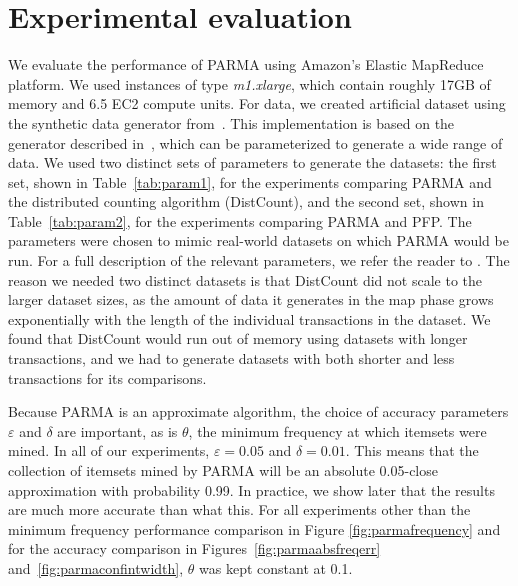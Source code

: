 \section{Experimental evaluation}
\label{sec:parmaeval}

We evaluate the performance of PARMA using Amazon's Elastic
MapReduce platform. We used instances of type \emph{m1.xlarge}, which
contain roughly 17GB of memory and 6.5 EC2 compute units.
For data, we created artificial dataset using the synthetic data
generator from~\citep{ARTool}. This implementation is based on the
generator described in~\citep{AgrawalS94}, which can be parameterized to generate a wide
range of data. We used two distinct sets of parameters to generate the
datasets: the first set, shown in Table~\ref{tab:param1}, for the experiments
comparing PARMA and the distributed counting algorithm
(DistCount), and the second set, shown in Table~\ref{tab:param2},
for the experiments comparing PARMA and PFP.
The parameters were
chosen to mimic real-world datasets on which PARMA would be run. For a
full description of the relevant parameters, we refer the reader to
\citep{AgrawalS94}.  
The reason we needed two distinct datasets is that DistCount did not scale to
the larger dataset sizes,  as the amount of data it generates in the map phase
grows exponentially with the length of the individual transactions in the
dataset.  We found that DistCount would run out of memory using datasets with
longer transactions, and we had to generate datasets with both shorter and less
transactions for its comparisons. 

Because PARMA is an approximate algorithm, the choice of accuracy
parameters $\varepsilon$ and $\delta$ are important, as is $\theta$,
the minimum frequency at which itemsets were mined. In all of our
experiments, $\varepsilon = 0.05$ and $\delta = 0.01$. This means that
the collection of itemsets mined by PARMA will be an absolute 0.05-close
approximation with probability 0.99. In practice, we show later that the results
are much more accurate than what this. For all experiments other than the
minimum frequency performance comparison in Figure \ref{fig:parmafrequency} and for
the accuracy comparison in Figures~\ref{fig:parmaabsfreqerr}
and~\ref{fig:parmaconfintwidth}, $\theta$ was kept constant at 0.1.

